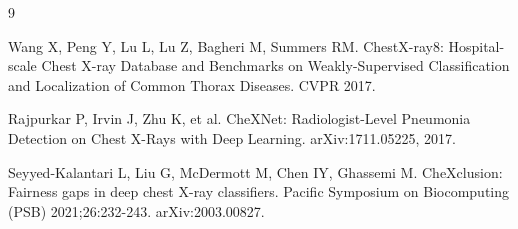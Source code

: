 \documentclass[11pt]{article}
\begin{document}
\begin{thebibliography}{9}

Wang X, Peng Y, Lu L, Lu Z, Bagheri M, Summers RM.
ChestX-ray8: Hospital-scale Chest X-ray Database and Benchmarks on Weakly-Supervised Classification and Localization of Common Thorax Diseases.
CVPR 2017.

Rajpurkar P, Irvin J, Zhu K, et al.
CheXNet: Radiologist-Level Pneumonia Detection on Chest X-Rays with Deep Learning.
arXiv:1711.05225, 2017.

Seyyed-Kalantari L, Liu G, McDermott M, Chen IY, Ghassemi M.
CheXclusion: Fairness gaps in deep chest X-ray classifiers.
Pacific Symposium on Biocomputing (PSB) 2021;26:232-243. arXiv:2003.00827.

\end{thebibliography}
\end{document}
